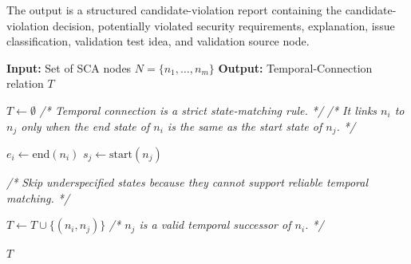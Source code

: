 The output is a structured candidate-violation report containing the
candidate-violation decision, potentially violated security
requirements, explanation, issue classification, validation test idea,
and validation source node.


\begin{algorithm}[ht]
\caption{Temporal Connection}
\label{alg:temporal_connection}
\scriptsize
\begin{algorithmic}[1]

\State \textbf{Input:} Set of SCA nodes $N=\{n_1,\dots,n_m\}$
\State \textbf{Output:} Temporal-Connection relation $T$

\State $T \leftarrow \emptyset$
\State \textit{/* Temporal connection is a strict state-matching rule. */}
\State \textit{/* It links $n_i$ to $n_j$ only when the end state of $n_i$ is the same as the start state of $n_j$. */}


    \State $e_i \leftarrow \text{end}(n_i)$
    \State $s_j \leftarrow \text{start}(n_j)$

    \State \textit{/* Skip underspecified states because they cannot support reliable temporal matching. */}

        \State $T \leftarrow T \cup \{(n_i,n_j)\}$
        \State \textit{/* $n_j$ is a valid temporal successor of $n_i$. */}

    \EndIf

\EndFor

\State \Return $T$

\end{algorithmic}
\end{algorithm}

